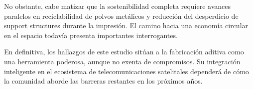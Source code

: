 No obstante, cabe matizar que la sostenibilidad completa requiere avances paralelos en reciclabilidad de polvos metálicos y reducción del desperdicio de support structures durante la impresión. El camino hacia una economía circular en el espacio todavía presenta importantes interrogantes.

En definitiva, los hallazgos de este estudio sitúan a la fabricación aditiva como una herramienta poderosa, aunque no exenta de compromisos. Su integración inteligente en el ecosistema de telecomunicaciones satelitales dependerá de cómo la comunidad aborde las barreras restantes en los próximos años.